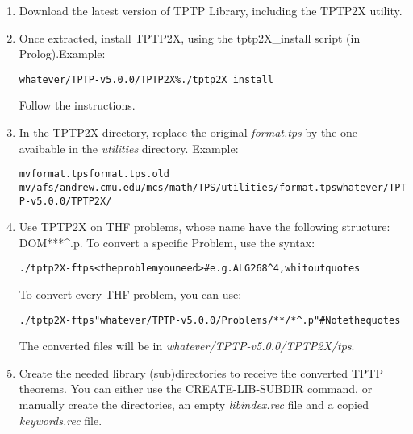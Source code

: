 \begin{enumerate}

\item Download the latest version of TPTP Library, including the TPTP2X utility.

\item Once extracted, install TPTP2X, using the tptp2X\_install script (in
Prolog).Example:
\begin{alltt}
whatever/TPTP-v5.0.0/TPTP2X\% ./tptp2X\_install
\end{alltt}

Follow the instructions.

\item In the TPTP2X directory, replace the original {\it format.tps} by the one
avaibable in the {\it utilities} directory. Example:
\begin{alltt}
mv format.tps format.tps.old
mv /afs/andrew.cmu.edu/mcs/math/TPS/utilities/format.tps whatever/TPTP-v5.0.0/TPTP2X/
\end{alltt}

\item Use TPTP2X on THF problems, whose name have the following structure:
DOM***\textasciicircum *.p.
To convert a specific Problem, use the syntax:
\begin{alltt}
./tptp2X -f tps <the problem you need> \# e.g. ALG268\textasciicircum 4, whitout quotes
\end{alltt}
To convert every THF problem, you can use:
\begin{alltt}
./tptp2X -f tps "whatever/TPTP-v5.0.0/Problems/**/*\textasciicircum* .p" \# Note the quotes
\end{alltt}

The converted files will be in {\it whatever/TPTP-v5.0.0/TPTP2X/tps}.

\item Create the needed library (sub)directories to receive the converted
TPTP theorems. You can either use the CREATE-LIB-SUBDIR command, or manually
create the directories, an empty {\it libindex.rec} file and a copied
{\it keywords.rec} file.


\end{enumerate}
